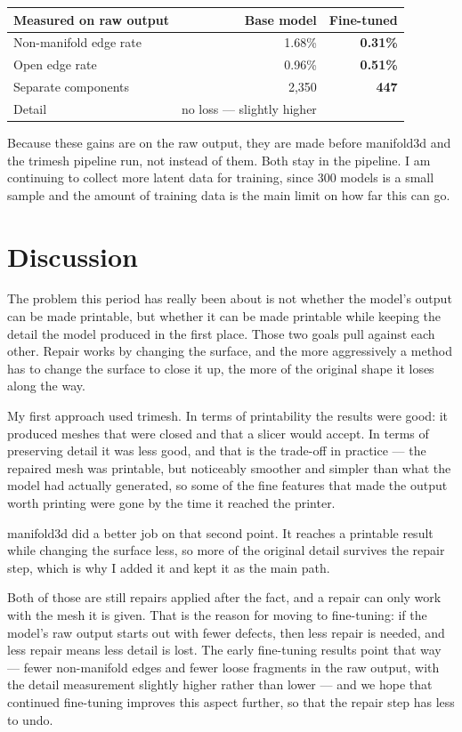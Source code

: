 \documentclass[11pt,a4paper]{article}
\begin{document}
\begin{table}[htbp]\centering\small
\begin{tabular}{@{}lrr@{}}\toprule
\textbf{Measured on raw output} & \textbf{Base model} & \textbf{Fine-tuned} \\ \midrule
Non-manifold edge rate & 1.68\% & \textcolor{good}{\textbf{0.31\%}} \\
Open edge rate & 0.96\% & \textcolor{good}{\textbf{0.51\%}} \\
Separate components & 2,350 & \textcolor{good}{\textbf{447}} \\
Detail & no loss --- slightly higher &  \\
\bottomrule\end{tabular}\end{table}
Because these gains are on the raw output, they are made before manifold3d and the trimesh pipeline run, not instead of them. Both stay in the pipeline. I am continuing to collect more latent data for training, since 300 models is a small sample and the amount of training data is the main limit on how far this can go.


\section{Discussion}
The problem this period has really been about is not whether the model's output can be made printable, but whether it can be made printable while keeping the detail the model produced in the first place. Those two goals pull against each other. Repair works by changing the surface, and the more aggressively a method has to change the surface to close it up, the more of the original shape it loses along the way.

My first approach used trimesh. In terms of printability the results were good: it produced meshes that were closed and that a slicer would accept. In terms of preserving detail it was less good, and that is the trade-off in practice --- the repaired mesh was printable, but noticeably smoother and simpler than what the model had actually generated, so some of the fine features that made the output worth printing were gone by the time it reached the printer.

manifold3d did a better job on that second point. It reaches a printable result while changing the surface less, so more of the original detail survives the repair step, which is why I added it and kept it as the main path.

Both of those are still repairs applied after the fact, and a repair can only work with the mesh it is given. That is the reason for moving to fine-tuning: if the model's raw output starts out with fewer defects, then less repair is needed, and less repair means less detail is lost. The early fine-tuning results point that way --- fewer non-manifold edges and fewer loose fragments in the raw output, with the detail measurement slightly higher rather than lower --- and we hope that continued fine-tuning improves this aspect further, so that the repair step has less to undo.
\end{document}
